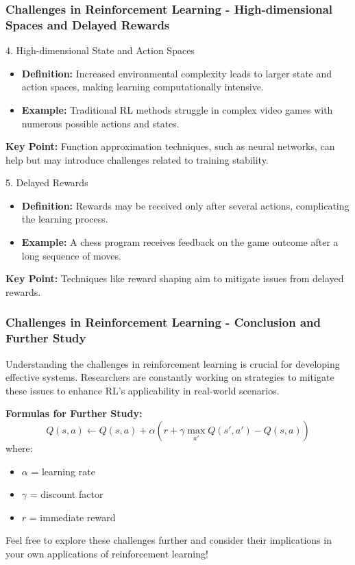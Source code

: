 \documentclass[aspectratio=169]{beamer}
\begin{document}
\begin{frame}[fragile]
    \frametitle{Challenges in Reinforcement Learning - High-dimensional Spaces and Delayed Rewards}
    \begin{block}{4. High-dimensional State and Action Spaces}
        \begin{itemize}
            \item \textbf{Definition:} Increased environmental complexity leads to larger state and action spaces, making learning computationally intensive.
            \item \textbf{Example:} Traditional RL methods struggle in complex video games with numerous possible actions and states.
        \end{itemize}
    \end{block}
    
    \textbf{Key Point:} Function approximation techniques, such as neural networks, can help but may introduce challenges related to training stability.
    
    \begin{block}{5. Delayed Rewards}
        \begin{itemize}
            \item \textbf{Definition:} Rewards may be received only after several actions, complicating the learning process.
            \item \textbf{Example:} A chess program receives feedback on the game outcome after a long sequence of moves.
        \end{itemize}
    \end{block}
    
    \textbf{Key Point:} Techniques like reward shaping aim to mitigate issues from delayed rewards.
\end{frame}

\begin{frame}[fragile]
    \frametitle{Challenges in Reinforcement Learning - Conclusion and Further Study}
    Understanding the challenges in reinforcement learning is crucial for developing effective systems. Researchers are constantly working on strategies to mitigate these issues to enhance RL's applicability in real-world scenarios.
    
    \textbf{Formulas for Further Study:}
    \begin{equation}
        Q(s, a) \leftarrow Q(s, a) + \alpha \left( r + \gamma \max_{a'} Q(s', a') - Q(s, a) \right)
    \end{equation}
    where:
    \begin{itemize}
        \item \( \alpha \) = learning rate
        \item \( \gamma \) = discount factor
        \item \( r \) = immediate reward
    \end{itemize}
    
    Feel free to explore these challenges further and consider their implications in your own applications of reinforcement learning!
\end{frame}
\end{document}
